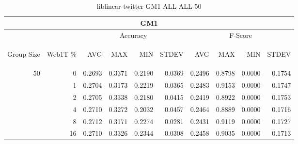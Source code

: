 \begin{center}
\begin{table}[htbp]
\begin{tabular}{ | r | r | r | r | r | r | r | r | r | r |}
\hline
\multicolumn{10}{|c|}{GM1}\\
\hline
 & & \multicolumn{4}{|c|}{Accuracy} & \multicolumn{4}{|c|}{F-Score}\\ \cline{3-10}
\begin{sideways}Group Size\end{sideways} & \begin{sideways}Web1T \%\end{sideways} & \begin{sideways}AVG\end{sideways} & \begin{sideways}MAX\end{sideways} & \begin{sideways}MIN\end{sideways} & \begin{sideways}STDEV\end{sideways} & \begin{sideways}AVG\end{sideways} & \begin{sideways}MAX\end{sideways} & \begin{sideways}MIN\end{sideways} & \begin{sideways}STDEV\end{sideways}\\
\hline
\multirow{5}{*}{50}
 & 0 & 0.2693 & 0.3371 & 0.2190 & 0.0369 & 0.2496 & 0.8798 & 0.0000 & 0.1754\\ \cline{2-10}
 & 1 & 0.2704 & 0.3173 & 0.2219 & 0.0365 & 0.2483 & 0.9153 & 0.0000 & 0.1747\\ \cline{2-10}
 & 2 & 0.2705 & 0.3338 & 0.2180 & 0.0415 & 0.2419 & 0.8922 & 0.0000 & 0.1753\\ \cline{2-10}
 & 4 & 0.2710 & 0.3272 & 0.2032 & 0.0457 & 0.2464 & 0.8889 & 0.0000 & 0.1716\\ \cline{2-10}
 & 8 & 0.2712 & 0.3171 & 0.2274 & 0.0281 & 0.2431 & 0.9119 & 0.0000 & 0.1727\\ \cline{2-10}
 & 16 & 0.2710 & 0.3326 & 0.2344 & 0.0308 & 0.2458 & 0.9035 & 0.0000 & 0.1713\\ \cline{2-10}
\hline
\end{tabular}
\caption{liblinear-twitter-GM1-ALL-ALL-50}
\label{table:liblinear-twitter-GM1-ALL-ALL-50}
\end{table}
\end{center}


